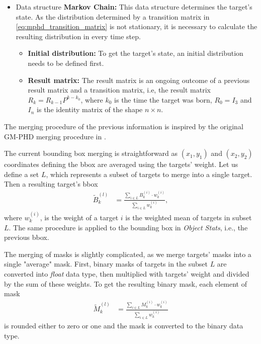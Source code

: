 \begin{itemize}
\begin{itemize}
      \end{itemize}
  \item Data structure \textbf{Markov Chain:} This data structure determines the target's state. As the
  distribution determined by a transition matrix in \eqref{eq:mphd_transition_matrix} is not stationary, it is necessary
  to calculate the resulting distribution in every time step.
      \begin{itemize}
        \item \textbf{Initial distribution:} To get the target's state, an initial distribution needs to be defined
        first.
        \item \textbf{Result matrix:} The result matrix is an ongoing outcome of a previous result matrix and a
        transition
        matrix, i.e, the result matrix $R_k = R_{k-1} P^{k-k_0}$, where $k_0$ is the time the target was born,
        $R_0 = I_3$ and $I_n$ is the identity matrix of the shape $n\times n$.
      \end{itemize}
\end{itemize}

The merging procedure of the previous information is inspired by the original GM-PHD merging procedure in
\cite{VoMaPHD2006}.

The current bounding box merging is straightforward as $(x_1,y_1)$ and $(x_2,y_2)$ coordinates defining the bbox are
averaged using the targets' weight. Let us define a set $L$, which represents a subset of targets to merge into a single
target. Then a resulting target's bbox
\begin{align}
  \tilde{B}_k^{(l)} &= \frac{\sum_{i \in L} B_k^{(i)} \cdot w_k^{(i)}}{\sum_{i \in L}{w_k^{(i)}}},
\end{align}
where $w_k^{(i)}$, is the weight of a target $i$ is the weighted mean of targets in subset $L$. The same procedure is
applied to the bounding box in \textit{Object Stats}, i.e., the previous bbox.

The merging of masks is slightly complicated, as we merge targets' masks into \linebreak a single "average" mask. First, binary
masks of targets in the subset $L$ are converted into \textit{float} data type, then multiplied with targets' weight
and
divided by the sum of these weights. To get the resulting binary mask, each element of mask
\begin{align}
  \tilde{M}_k^{(l)} &= \frac{\sum_{i \in L} M_k^{(i)} \cdot w_k^{(i)}}{\sum_{i \in L}{w_k^{(i)}}}
\end{align}
is rounded either to zero or one and the mask is converted to the binary data type.

